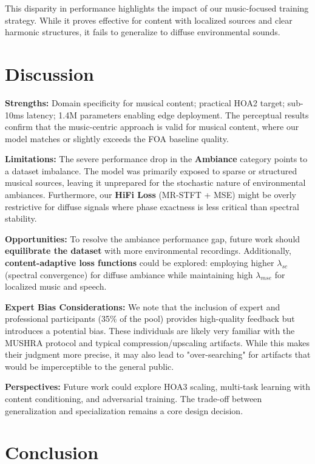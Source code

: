 \documentclass[10pt,twocolumn]{article}
\begin{document}
This disparity in performance highlights the impact of our music-focused training strategy. While it proves effective for content with localized sources and clear harmonic structures, it fails to generalize to diffuse environmental sounds.

\section{Discussion}

\textbf{Strengths:} Domain specificity for musical content; practical HOA2 target; sub-10ms latency; 1.4M parameters enabling edge deployment. The perceptual results confirm that the music-centric approach is valid for musical content, where our model matches or slightly exceeds the FOA baseline quality.

\textbf{Limitations:} The severe performance drop in the \textbf{Ambiance} category points to a dataset imbalance. The model was primarily exposed to sparse or structured musical sources, leaving it unprepared for the stochastic nature of environmental ambiances. Furthermore, our \textbf{HiFi Loss} (MR-STFT + MSE) might be overly restrictive for diffuse signals where phase exactness is less critical than spectral stability.

\textbf{Opportunities:} To resolve the ambiance performance gap, future work should \textbf{equilibrate the dataset} with more environmental recordings. Additionally, \textbf{content-adaptive loss functions} could be explored: employing higher $\lambda_{sc}$ (spectral convergence) for diffuse ambiance while maintaining high $\lambda_{mse}$ for localized music and speech.

\textbf{Expert Bias Considerations:} We note that the inclusion of expert and professional participants (35\% of the pool) provides high-quality feedback but introduces a potential bias. These individuals are likely very familiar with the MUSHRA protocol and typical compression/upscaling artifacts. While this makes their judgment more precise, it may also lead to "over-searching" for artifacts that would be imperceptible to the general public.

\textbf{Perspectives:} Future work could explore HOA3 scaling, multi-task learning with content conditioning, and adversarial training. The trade-off between generalization and specialization remains a core design decision.

\section{Conclusion}
\end{document}
